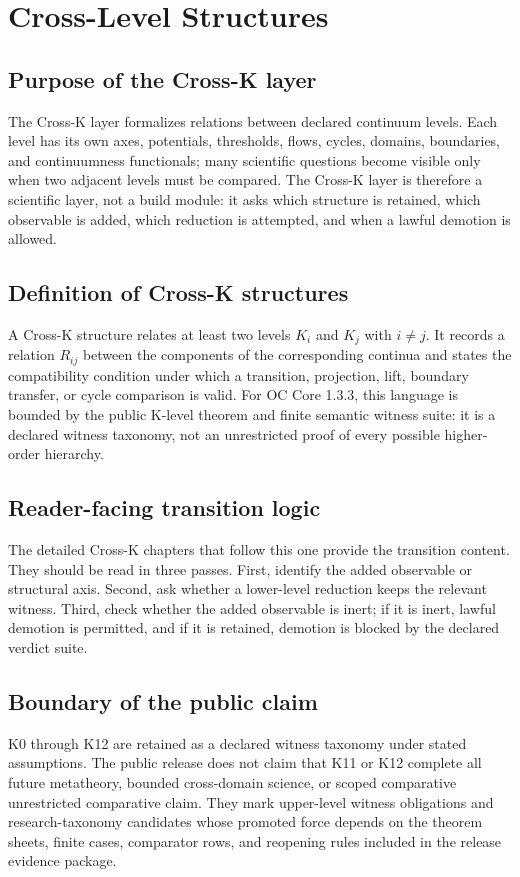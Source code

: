 
\section{Cross-Level Structures}
\label{sec:crossk_master}

\subsection{Purpose of the Cross-K layer}
The Cross-K layer formalizes relations between declared continuum levels. Each
level has its own axes, potentials, thresholds, flows, cycles, domains,
boundaries, and continuumness functionals; many scientific questions become
visible only when two adjacent levels must be compared. The Cross-K layer is
therefore a scientific layer, not a build module: it asks which structure is
retained, which observable is added, which reduction is attempted, and when a
lawful demotion is allowed.

\subsection{Definition of Cross-K structures}
A Cross-K structure relates at least two levels \(K_i\) and \(K_j\) with
\(i \ne j\). It records a relation \(R_{ij}\) between the components of the
corresponding continua and states the compatibility condition under which a
transition, projection, lift, boundary transfer, or cycle comparison is valid.
For OC Core 1.3.3, this language is bounded by the public K-level theorem and
finite semantic witness suite: it is a declared witness taxonomy, not an
unrestricted proof of every possible higher-order hierarchy.

\subsection{Reader-facing transition logic}
The detailed Cross-K chapters that follow this one provide the transition
content. They should be read in three passes. First, identify the added
observable or structural axis. Second, ask whether a lower-level reduction keeps
the relevant witness. Third, check whether the added observable is inert; if it
is inert, lawful demotion is permitted, and if it is retained, demotion is
blocked by the declared verdict suite.

\subsection{Boundary of the public claim}
K0 through K12 are retained as a declared witness taxonomy under stated
assumptions. The public release does not claim that K11 or K12 complete all
future metatheory, bounded cross-domain science, or scoped comparative unrestricted comparative claim.
They mark upper-level witness obligations and research-taxonomy candidates
whose promoted force depends on the theorem sheets, finite cases, comparator
rows, and reopening rules included in the release evidence package.
